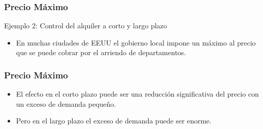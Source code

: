 \documentclass[dvipsnames,table,leqno]{beamer}
\begin{document}
		\begin{frame}
			\frametitle{Precio Máximo}
			Ejemplo 2: Control del alquiler a corto y largo plazo
				\begin{itemize}
					\item En muchas ciudades de EEUU el gobierno local impone un máximo al precio que se puede cobrar por el arriendo de departamentos.
				\end{itemize}
		\end{frame}		
		
				\begin{frame}
			\frametitle{Precio Máximo}
				\begin{itemize}
					\item El efecto en el corto plazo puede ser una reducción significativa del precio con un exceso de demanda pequeño.
					\item Pero en el largo plazo el exceso de demanda puede ser enorme.
				\end{itemize}
		\end{frame}	
\end{document}
